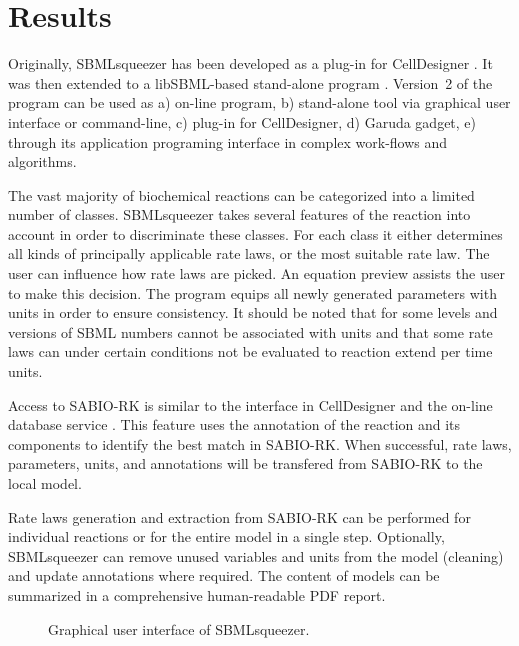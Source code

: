\documentclass{bioinfo}
\begin{document}
\vspace{-1cm}
\section{Results}

Originally, SBMLsqueezer has been developed as a plug-in for CellDesigner \citep{Draeger2008}.
It was then extended to a libSBML-based stand-alone program \citep{Draeger2010}.
Version~2 of the program can be used as a) on-line program, b) stand-alone tool via graphical user interface or command-line, c) plug-in for CellDesigner, d) Garuda gadget, e) through its application programing interface in complex work-flows and algorithms.

The vast majority of biochemical reactions can be categorized into a limited number of classes.
SBMLsqueezer takes several features of the reaction into account in order to discriminate these classes.
For each class it either determines all kinds of principally applicable rate laws, or the most suitable rate law.
The user can influence how rate laws are picked.
An equation preview assists the user to make this decision.
The program equips all newly generated parameters with units in order to ensure consistency.
It should be noted that for some levels and versions of SBML numbers cannot be associated with units and that some rate laws can under certain conditions not be evaluated to reaction extend per time units.

Access to SABIO-RK is similar to the interface in CellDesigner and the on-line database service \citep{Funahashi2007}.
This feature uses the annotation of the reaction and its components to identify the best match in SABIO-RK.
When successful, rate laws, parameters, units, and annotations will be transfered from SABIO-RK to the local model.

Rate laws generation and extraction from SABIO-RK can be performed for individual reactions or for the entire model in a single step.
Optionally, SBMLsqueezer can remove unused variables and units from the model (cleaning) and update annotations where required.
The content of models can be summarized in a comprehensive human-readable PDF report.

\begin{figure}
\caption[Graphical user interface of SBMLsqueezer]{Graphical user interface of SBMLsqueezer.%
}\label{fig:SBMLsqueezer}
\vspace{-.45cm}
\end{figure}
\end{document}

